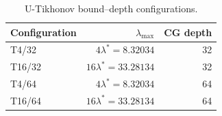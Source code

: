 \begin{table}[htbp]
\centering
\caption{U-Tikhonov bound--depth configurations.}
\label{tab:u_tikhonov_configurations}
\begin{tabular}{lrr}
\toprule
Configuration & $\lambda_{\max}$ & CG depth \\
\midrule
T4/32 & $4\lambda^*=8.32034$ & 32 \\
T16/32 & $16\lambda^*=33.28134$ & 32 \\
T4/64 & $4\lambda^*=8.32034$ & 64 \\
T16/64 & $16\lambda^*=33.28134$ & 64 \\
\bottomrule
\end{tabular}
\end{table}
